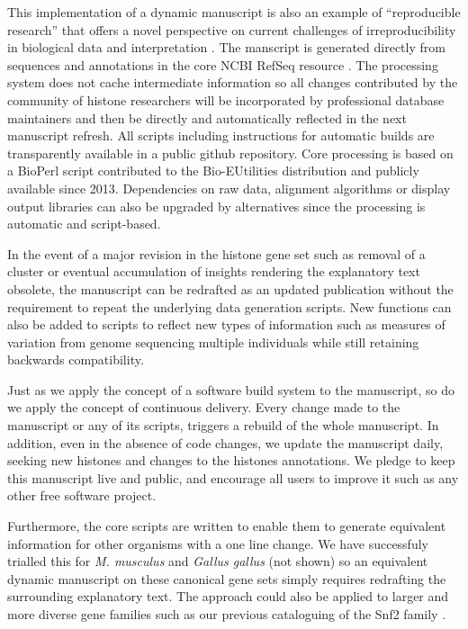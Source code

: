   This implementation of a dynamic manuscript
  is also an example of ``reproducible research'' \citep{reproducible-research-bioinformatics,reproducible-research-law}
  that offers a novel perspective on
  current challenges of irreproducibility in biological data and interpretation \citep{ErrorProne2012,OpenPrograms2012}.
  The manscript is generated directly from sequences and annotations
  in the core NCBI RefSeq resource \citep{PruittRefseq2014}.
  The processing system does not cache intermediate information so all changes contributed by
  the community of histone researchers will be incorporated by professional database maintainers
  and then be directly and automatically reflected in the next manuscript refresh.
  All scripts including instructions for automatic builds
  are transparently available in a public github repository.
  Core processing is based on a BioPerl script contributed to the Bio-EUtilities distribution
  and publicly available since 2013.
  Dependencies on raw data, alignment algorithms or display output libraries
  can also be upgraded by alternatives since the processing is automatic and script-based.

  In the event of a major revision in the histone gene set such as removal of a cluster
  or eventual accumulation of insights rendering the explanatory text obsolete,
  the manuscript can be redrafted as an updated publication
  without the requirement to repeat the underlying data generation scripts.
  New functions can also be added to scripts to reflect new types of information
  such as measures of variation from genome sequencing multiple individuals
  while still retaining backwards compatibility.

  Just as we apply the concept of a software build system to the
  manuscript, so do we apply the concept of continuous delivery.
  Every change made to the manuscript or any of its scripts,
  triggers a rebuild of the whole manuscript.  In addition, even
  in the absence of code changes, we update the manuscript daily,
  seeking new histones and changes to the histones annotations.
  We pledge to keep this manuscript live and public, and encourage
  all users to improve it such as any other free software project.

  Furthermore, the core scripts are written to enable them to generate
  equivalent information for other organisms with a one line change.
  We have successfuly trialled this for \textit{M. musculus} and \textit{Gallus gallus} (not shown)
  so an equivalent dynamic manuscript on these canonical gene sets
  simply requires redrafting the surrounding explanatory text.
  The approach could also be applied to larger and more diverse gene families such as
  our previous cataloguing of the Snf2 family \citep{andrew-snf2-catalogue}.
